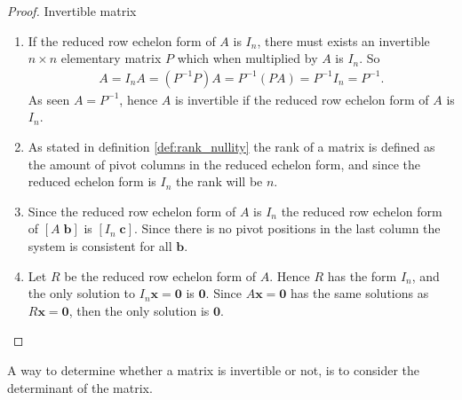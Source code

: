 \begin{proof}{Invertible matrix}
\begin{enumerate}
    \item  If the reduced row echelon form of $A$ is $I_n$, there must exists an invertible $n \times n$ elementary matrix $P$ which when multiplied by $A$ is $I_n$. So
    \begin{align*}
        A=I_nA=(P^{-1}P)A=P^{-1}(PA)=P^{-1}I_n=P^{-1}.
    \end{align*}
    As seen $A=P^{-1}$, hence $A$ is invertible if the reduced row echelon form of $A$ is $I_n$. 
    \item As stated in definition \ref{def:rank_nullity} the rank of a matrix is defined as the amount of pivot columns in the reduced echelon form, and since the reduced echelon form is $I_n$ the rank will be $n$.
    \item Since the reduced row echelon form of $A$ is $I_n$ the reduced row echelon form of $[A\;\textbf{b}]$ is $[I_n\;\textbf{c}]$. Since there is no pivot positions in the last column the system is consistent for all $\textbf{b}$.
    \item Let $R$ be the reduced row echelon form of $A$. 
    Hence $R$ has the form $I_n$, and the only solution to $I_n\mathbf{x}= \mathbf{0}$ is $\mathbf{0}$. Since $A\mathbf{x}=\mathbf{0}$ has the same solutions as $R\mathbf{x}=\mathbf{0}$, then the only solution is $\mathbf{0}$.
\end{enumerate}
\qedsymbol
\end{proof}
A way to determine whether a matrix is invertible or not, is to consider the determinant of the matrix.

